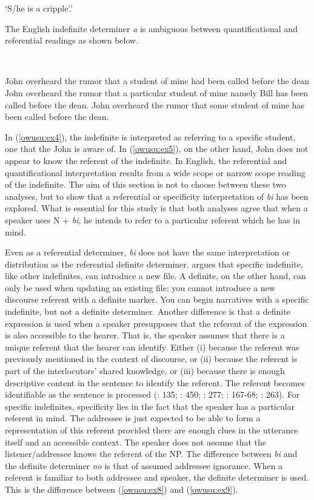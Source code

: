 \documentclass[output=paper,modfonts,nonflat,draftmode]{langsci/langscibook}
\begin{document}
\glt ‘S/he is a cripple’.'
\z \z 

The English indefinite determiner \emph{a} is ambiguous between quantificational and referential readings as shown below.

\ea
{}\\
\ea\label{owusu:ex3}

John overheard the rumor that a student of mine had been called before the dean
\ea \label{owusu:ex4} John overheard the rumor that a particular student of mine namely Bill has been called before the dean.
\ex \label{owusu:ex5} John overheard the rumor that some student of mine has been called before the dean.
\z\z 
\z 

In (\ref{owusu:ex4}), the indefinite is interpreted as referring to a specific student, one that the John is aware of. In (\ref{owusu:ex5}), on the other hand, John does not appear to know the referent of the indefinite. In English, the referential and quantificational interpretation results from a wide scope or narrow scope reading of the indefinite. 
The aim of this section is not to choose between these two analyses, but to show that a referential or specificity interpretation of \emph{bi} has been explored. What is essential for this study is that both analyses agree that when a speaker uses  N + \emph{bi}, he intends to refer to a particular referent which he has in mind.            


Even as a referential determiner, \emph{bi} does not have the same interpretation or distribution as the referential definite determiner. \citet{Heim1983} argues that specific indefinite, like other indefinites, can introduce a new file. A definite, on the other hand, can only be used when updating an existing file; you cannot introduce a new discourse referent with a definite marker. You can begin narratives with a specific indefinite, but not a definite determiner. Another difference is that a definite expression is used when a speaker presupposes that the referent of the expression is also accessible to the hearer. That is, the speaker assumes that there is a unique referent that the hearer can identify. Either (i) because the referent was previously mentioned in the context of discourse, or (ii) because the referent is part of the interlocutors’ shared knowledge, or (iii) because there is enough descriptive content in the sentence to identify the referent.  The referent becomes identifiable as the sentence is processed (\citealt{Comrie1989}: 135; \citealt{Givón2001}: 450; \citealt{GundelEtAlZacharski1993}: 277; \citealt{Hawkins1978}: 167-68; \citealt{Payne1997}: 263). For specific indefinites, specificity lies in the fact that the speaker has a particular referent in mind. The addressee is just expected to be able to form a representation of this referent provided there are enough clues in the utterance itself and an accessible context. The speaker does not assume that the listener/addressee knows the referent of the NP. The difference between \emph{bi} and the definite determiner \emph{no} is that of assumed addressee ignorance. When a referent is familiar to both addressee and speaker, the definite determiner is used. This is the difference between (\ref{owusu:ex8}) and (\ref{owusu:ex9}). 
\end{document}
